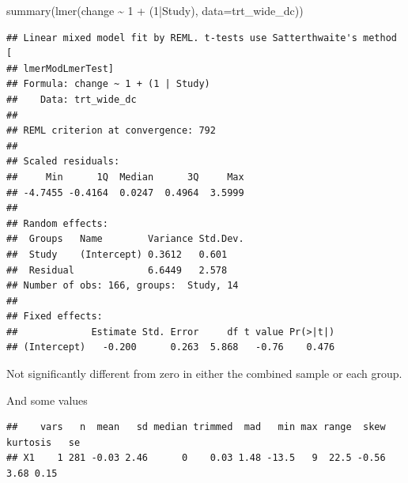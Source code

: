 \documentclass[
]{article}
\newenvironment{Shaded}{\begin{snugshade}}{\end{snugshade}}
\newcommand{\AttributeTok}[1]{\textcolor[rgb]{0.77,0.63,0.00}{#1}}
\newcommand{\DecValTok}[1]{\textcolor[rgb]{0.00,0.00,0.81}{#1}}
\newcommand{\FunctionTok}[1]{\textcolor[rgb]{0.00,0.00,0.00}{#1}}
\newcommand{\NormalTok}[1]{#1}
\newcommand{\SpecialCharTok}[1]{\textcolor[rgb]{0.00,0.00,0.00}{#1}}
\begin{document}
\begin{Shaded}
\begin{Highlighting}[]
\FunctionTok{summary}\NormalTok{(}\FunctionTok{lmer}\NormalTok{(change }\SpecialCharTok{\textasciitilde{}} \DecValTok{1} \SpecialCharTok{+}\NormalTok{ (}\DecValTok{1}\SpecialCharTok{|}\NormalTok{Study), }\AttributeTok{data=}\NormalTok{trt\_wide\_dc))}
\end{Highlighting}
\end{Shaded}

\begin{verbatim}
## Linear mixed model fit by REML. t-tests use Satterthwaite's method [
## lmerModLmerTest]
## Formula: change ~ 1 + (1 | Study)
##    Data: trt_wide_dc
## 
## REML criterion at convergence: 792
## 
## Scaled residuals: 
##     Min      1Q  Median      3Q     Max 
## -4.7455 -0.4164  0.0247  0.4964  3.5999 
## 
## Random effects:
##  Groups   Name        Variance Std.Dev.
##  Study    (Intercept) 0.3612   0.601   
##  Residual             6.6449   2.578   
## Number of obs: 166, groups:  Study, 14
## 
## Fixed effects:
##             Estimate Std. Error     df t value Pr(>|t|)
## (Intercept)   -0.200      0.263  5.868   -0.76    0.476
\end{verbatim}

Not significantly different from zero in either the combined sample or
each group.

And some values

\begin{Shaded}
\end{Shaded}

\begin{verbatim}
##    vars   n  mean   sd median trimmed  mad   min max range  skew kurtosis   se
## X1    1 281 -0.03 2.46      0    0.03 1.48 -13.5   9  22.5 -0.56     3.68 0.15
\end{verbatim}

\begin{Shaded}
\end{Shaded}
\end{document}
